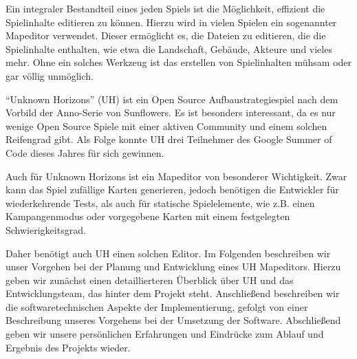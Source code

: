 Ein integraler Bestandteil eines jeden Spiels ist die Möglichkeit, effizient die Spielinhalte
editieren zu können. Hierzu wird in vielen Spielen ein sogenannter Mapeditor verwendet.
Dieser ermöglicht es, die Dateien zu editieren, die die Spielinhalte enthalten, wie etwa
die Landschaft, Gebäude, Akteure und vieles mehr.
Ohne ein solches Werkzeug ist das erstellen von Spielinhalten mühsam oder gar
völlig unmöglich.

\enquote{Unknown Horizons} (UH) ist ein Open Source
Aufbaustrategiespiel nach dem Vorbild der Anno-Serie von Sunflowers.
Es ist
besonders interessant, da es nur wenige Open Source Spiele mit einer aktiven
Community und einem solchen Reifengrad gibt. Als Folge konnte UH drei Teilnehmer des
Google Summer of Code dieses Jahres für sich gewinnen.

Auch für Unknown Horizons ist ein Mapeditor von besonderer Wichtigkeit. Zwar kann das
Spiel zufällige Karten generieren, jedoch benötigen die Entwickler für wiederkehrende
Tests, als auch für statische Spielelemente, wie z.B. einen Kampangenmodus oder vorgegebene
Karten mit einem festgelegten Schwierigkeitsgrad.

Daher benötigt auch UH einen solchen Editor. Im Folgenden beschreiben wir unser Vorgehen
bei der Planung und Entwicklung eines UH Mapeditors. Hierzu geben wir zunächst einen
detaillierteren Überblick über UH und das Entwicklungsteam, das hinter dem Projekt steht.
Anschließend beschreiben wir die softwaretechnischen Aspekte der Implementierung, gefolgt
von einer Beschreibung unseres Vorgehens bei der Umsetzung der Software. Abschließend
geben wir unsere persönlichen Erfahrungen und Eindrücke zum Ablauf und Ergebnis des Projekts
wieder.

